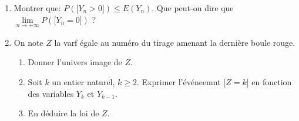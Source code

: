\documentclass[a4paper, 11pt,reqno]{article}
\begin{document}
\begin{correction}
\begin{enumerate}
		\item Montrer que: $P(\lbrack Y_n>0\rbrack)\leq E(Y_n)$. Que peut-on dire que $\lim\limits_{n\to +\infty} P(\lbrack Y_n=0\rbrack)$ ?
		\item On note $Z$ la varf \'egale au num\'ero du tirage amenant la derni\`ere boule rouge.
		      \begin{enumerate}
			      \item Donner l'univers image de $Z$.
			      \item Soit $k$ un entier naturel, $k\geq 2$. Exprimer l'\'ev\'eneemnt $\lbrack Z=k\rbrack$ en fonction des variables $Y_{k}$ et $Y_{k-1}$.
			      \item En d\'eduire la loi de $Z$.
		      \end{enumerate}
	\end{enumerate}
\end{correction}
\end{document}
